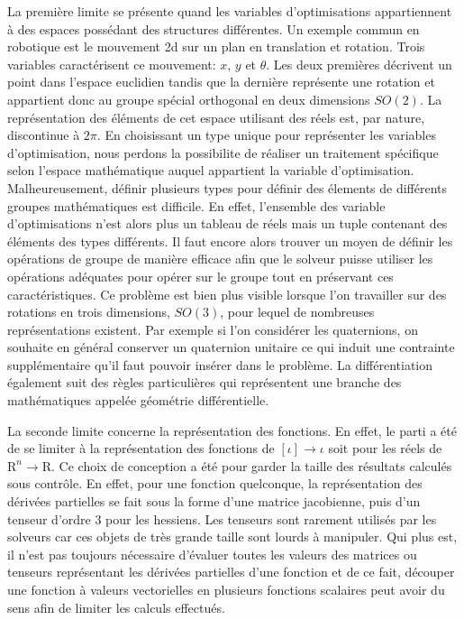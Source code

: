 La première limite se présente quand les variables d'optimisations
appartiennent à des espaces possédant des structures différentes. Un
exemple commun en robotique est le mouvement 2d sur un plan en
translation et rotation. Trois variables caractérisent ce mouvement:
$x$, $y$ et $\theta$. Les deux premières décrivent un point dans
l'espace euclidien tandis que la dernière représente une rotation et
appartient donc au groupe spécial orthogonal en deux dimensions
$SO(2)$. La représentation des éléments de cet espace utilisant des
réels est, par nature, discontinue à $2\pi$. En choisissant un type
unique pour représenter les variables d'optimisation, nous perdons la
possibilite de réaliser un traitement spécifique selon l'espace
mathématique auquel appartient la variable
d'optimisation. Malheureusement, définir plusieurs types pour définir
des élements de différents groupes mathématiques est difficile. En
effet, l'ensemble des variable d'optimisations n'est alors plus un
tableau de réels mais un tuple contenant des éléments des types
différents. Il faut encore alors trouver un moyen de définir les
opérations de groupe de manière efficace afin que le solveur puisse
utiliser les opérations adéquates pour opérer sur le groupe tout en
préservant ces caractéristiques. Ce problème est bien plus visible
lorsque l'on travailler sur des rotations en trois dimensions,
$SO(3)$, pour lequel de nombreuses représentations existent. Par
exemple si l'on considérer les quaternions, on souhaite en général
conserver un quaternion unitaire ce qui induit une contrainte
supplémentaire qu'il faut pouvoir insérer dans le problème. La
différentiation également suit des règles particulières qui
représentent une branche des mathématiques appelée géométrie
différentielle.

La seconde limite concerne la représentation des fonctions. En effet,
le parti a été de se limiter à la représentation des fonctions de
$[\iota] \rightarrow \iota$ soit pour les réels de $\mathrm{R}^n
\rightarrow \mathrm{R}$. Ce choix de conception a été pour garder la
taille des résultats calculés sous contrôle. En effet, pour une
fonction quelconque, la représentation des dérivées partielles se fait
sous la forme d'une matrice jacobienne, puis d'un tenseur d'ordre 3
pour les hessiens. Les tenseurs sont rarement utilisés par les
solveurs car ces objets de très grande taille sont lourds à
manipuler. Qui plus est, il n'est pas toujours nécessaire d'évaluer
toutes les valeurs des matrices ou tenseurs représentant les dérivées
partielles d'une fonction et de ce fait, découper une fonction à
valeurs vectorielles en plusieurs fonctions scalaires peut avoir du
sens afin de limiter les calculs effectués.


